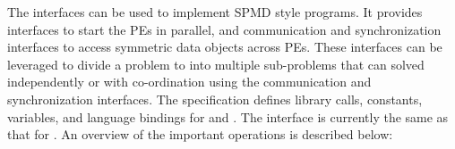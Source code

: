

The \openshmem{} interfaces can be used to implement \ac{SPMD} style programs. It provides interfaces 
to start the \openshmem{} \ac{PE}s in parallel, and communication and synchronization interfaces to access symmetric data objects across \ac{PE}s. These interfaces can be leveraged to divide a problem to into multiple sub-problems that can solved independently or with co-ordination using the communication and synchronization interfaces.
The \openshmem specification defines library calls, constants, variables, and language bindings for \Clang{} and \Fortran{}.
The \Cpp{} interface is currently the same as that for \Clang. An overview of the important \openshmem operations is described below:

